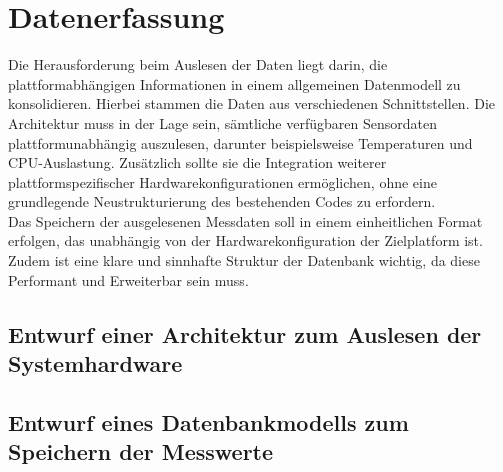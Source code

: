 \section{Datenerfassung}\label{sec:Datenerfassung}
Die Herausforderung beim Auslesen der Daten liegt darin, die plattformabhängigen Informationen in einem allgemeinen Datenmodell zu konsolidieren. Hierbei stammen die Daten aus verschiedenen Schnittstellen. Die Architektur muss in der Lage sein, sämtliche verfügbaren Sensordaten plattformunabhängig auszulesen, darunter beispielsweise Temperaturen und CPU-Auslastung. Zusätzlich sollte sie die Integration weiterer plattformspezifischer Hardwarekonfigurationen ermöglichen, ohne eine grundlegende Neustrukturierung des bestehenden Codes zu erfordern.\\
Das Speichern der ausgelesenen Messdaten soll in einem einheitlichen Format erfolgen, das unabhängig von der Hardwarekonfiguration der Zielplatform ist. Zudem ist eine klare und sinnhafte Struktur der Datenbank wichtig, da diese Performant und Erweiterbar sein muss.   

\subsection{Entwurf einer Architektur zum Auslesen der Systemhardware}
\subsection{Entwurf eines Datenbankmodells zum Speichern der Messwerte}
